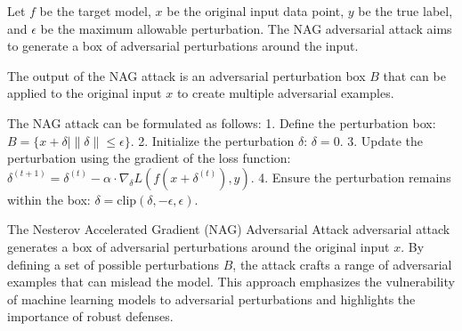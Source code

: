 Let \( f \) be the target model, \( x \) be the original input data point, \( y \) be the true label, and \( \epsilon \) be the maximum allowable perturbation. The NAG adversarial attack aims to generate a box of adversarial perturbations around the input.

The output of the NAG attack is an adversarial perturbation box \( B \) that can be applied to the original input \( x \) to create multiple adversarial examples.

The NAG attack can be formulated as follows:
1. Define the perturbation box:
   $
   B = \{ x + \delta \mid \|\delta\| \leq \epsilon \}.
   $
2. Initialize the perturbation \( \delta \):
   $
   \delta = 0.
   $
3. Update the perturbation using the gradient of the loss function:
   $
   \delta^{(t+1)} = \delta^{(t)} - \alpha \cdot \nabla_{\delta} L(f(x + \delta^{(t)}), y).
   $
4. Ensure the perturbation remains within the box:
   $
   \delta = \text{clip}(\delta, -\epsilon, \epsilon).
   $

The Nesterov Accelerated Gradient (NAG) Adversarial Attack adversarial attack generates a box of adversarial perturbations around the original input \( x \). By defining a set of possible perturbations \( B \), the attack crafts a range of adversarial examples that can mislead the model. This approach emphasizes the vulnerability of machine learning models to adversarial perturbations and highlights the importance of robust defenses.
